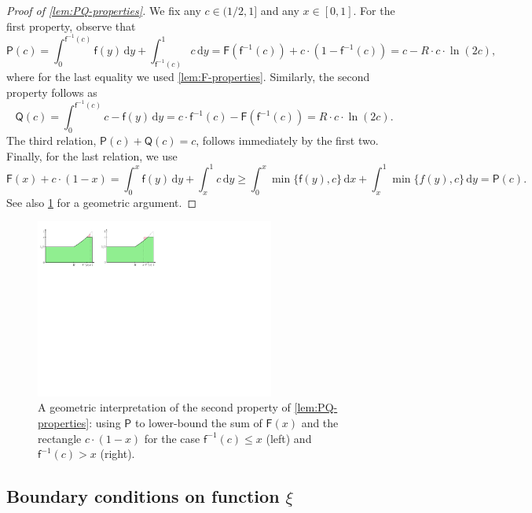 \documentclass[a4paper,USenglish,cleveref]{lipics-v2019}
\newcommand{\R}{\ensuremath{R}}
\newcommand{\f}{\textsf{f}}
\newcommand{\g}{\ensuremath{\xi}}
\newcommand{\fintegral}{\textsf{F}}
\newcommand{\water}{\textsf{Q}}
\newcommand{\cutintegral}{\textsf{P}}
\newcommand{\dd}{\mathrm{d}}
\begin{document}
\begin{proof}[Proof of \cref{lem:PQ-properties}]
  We fix any $c \in (1/2, 1]$ and any $x \in [0, 1]$.
  For the first property, observe that 
    \[ 
      \cutintegral(c) 
        = \int_0^{\f^{-1}(c)} \f(y) \, \dd y + \int_{\f^{-1}(c)}^1 c \, \dd y 
      = \fintegral(\f^{-1}(c)) + c \cdot (1-\f^{-1}(c)) 
      = c - \R \cdot c \cdot \ln (2 c),
  \]
  where for the last equality we used \cref{lem:F-properties}.
  Similarly, the second property follows as 
  \[
    \water(c) 
      = \int_0^{\f^{-1}(c)} c - \f(y) \, \dd y
      = c \cdot \f^{-1}(c) - \fintegral(\f^{-1}(c)) = \R \cdot c \cdot \ln(2 c) .
  \]
  The third relation, $\cutintegral(c) + \water(c) = c$, follows immediately 
  by the first two. Finally, for the last relation, we use
  \[
    \fintegral(x) + c \cdot (1 - x)
      = \int_0^{x} \f(y) \, \dd y + \int_{x}^1 c \, \dd y 
      \geq \int_0^{x} \min\{\f(y),c\} \, \dd x + \int_{x}^1 \min\{f(y), c\} \, \dd y 
      = \cutintegral(c).
  \]
  See also \cref{fig:F-vs-cutintegral} for a geometric argument.
  \end{proof}
    
\begin{figure}[t]
    \centering
    \includegraphics[width=0.7\textwidth]{images/obs.pdf}
    \caption{A geometric interpretation of the second property of \cref{lem:PQ-properties}:
    using $\cutintegral$ to lower-bound the sum of $\fintegral(x)$ and the rectangle $c \cdot (1-x)$
      for the case $\f^{-1}(c) \leq x$ (left) and $\f^{-1}(c) > x$ (right).}
    \label{fig:F-vs-cutintegral}
\end{figure}
  
 


\subsection{Boundary conditions on function \texorpdfstring{\g}{xi}}
\label{sec:boundary}
\end{document}
